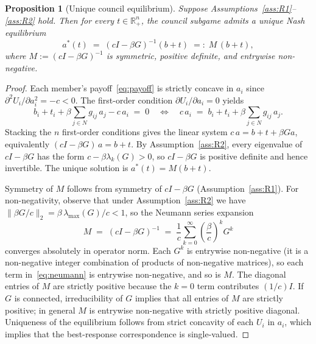 \documentclass[11pt,letterpaper]{article}
\theoremstyle{plain}
\newtheorem{proposition}{Proposition}
\theoremstyle{definition}
\theoremstyle{remark}
\begin{document}
\begin{proposition}[Unique council equilibrium]\label{prop:eq}
Suppose Assumptions~\ref{ass:R1}--\ref{ass:R2} hold. Then for every $t \in \mathbb{R}^n_+$, the council subgame admits a unique Nash equilibrium
\begin{equation}
a^*(t) \;=\; (cI - \beta G)^{-1}(b + t) \;=:\; M\,(b + t),
\label{eq:eq_action}
\end{equation}
where $M := (cI - \beta G)^{-1}$ is symmetric, positive definite, and entrywise non-negative.
\end{proposition}

\begin{proof}
Each member's payoff~\eqref{eq:payoff} is strictly concave in $a_i$ since $\partial^2 U_i / \partial a_i^2 = -c < 0$. The first-order condition $\partial U_i / \partial a_i = 0$ yields
\[
b_i + t_i + \beta \sum_{j \in N} g_{ij}\, a_j - c\, a_i \;=\; 0
\quad\Longleftrightarrow\quad
c\, a_i \;=\; b_i + t_i + \beta \sum_{j \in N} g_{ij}\, a_j.
\]
Stacking the $n$ first-order conditions gives the linear system $c\, a = b + t + \beta G a$, equivalently $(cI - \beta G)\, a = b + t$. By Assumption~\ref{ass:R2}, every eigenvalue of $cI - \beta G$ has the form $c - \beta \lambda_k(G) > 0$, so $cI - \beta G$ is positive definite and hence invertible. The unique solution is $a^*(t) = M(b+t)$.

Symmetry of $M$ follows from symmetry of $cI - \beta G$ (Assumption~\ref{ass:R1}). For non-negativity, observe that under Assumption~\ref{ass:R2} we have $\|\beta G / c\|_2 = \beta\,\lambda_{\max}(G) / c < 1$, so the Neumann series expansion
\begin{equation}
M \;=\; (cI - \beta G)^{-1} \;=\; \frac{1}{c}\sum_{k=0}^\infty \left(\frac{\beta}{c}\right)^{\!k} G^k
\label{eq:neumann}
\end{equation}
converges absolutely in operator norm. Each $G^k$ is entrywise non-negative (it is a non-negative integer combination of products of non-negative matrices), so each term in~\eqref{eq:neumann} is entrywise non-negative, and so is $M$. The diagonal entries of $M$ are strictly positive because the $k = 0$ term contributes $(1/c)I$. If $G$ is connected, irreducibility of $G$ implies that all entries of $M$ are strictly positive; in general $M$ is entrywise non-negative with strictly positive diagonal. Uniqueness of the equilibrium follows from strict concavity of each $U_i$ in $a_i$, which implies that the best-response correspondence is single-valued.
\end{proof}
\end{document}
